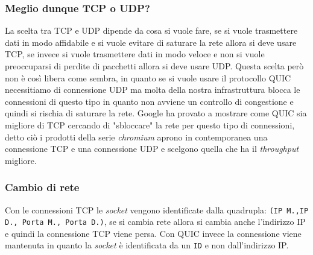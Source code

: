         \subsubsection{Meglio dunque \Acrshort*{TCP} o \Acrshort*{UDP}?}
        La scelta tra \Acrshort*{TCP} e \Acrshort*{UDP} dipende da cosa si vuole fare, se si vuole trasmettere dati in modo affidabile e si vuole evitare di saturare la rete allora si deve usare \Acrshort*{TCP}, se invece si vuole trasmettere dati in modo veloce e non si vuole preoccuparsi di perdite di pacchetti allora si deve usare \Acrshort*{UDP}. Questa scelta però non è così libera come sembra, in quanto se si vuole usare il protocollo \Acrshort*{QUIC} necessitiamo di connessione \Acrshort*{UDP} ma molta della nostra infrastruttura blocca le connessioni di questo tipo in quanto non avviene un controllo di congestione e quindi si rischia di saturare la rete. Google ha provato a mostrare come \Acrshort*{QUIC} sia migliore di \Acrshort*{TCP} cercando di "sbloccare" la rete per questo tipo di connessioni, detto ciò i prodotti della serie \textit{chromium} aprono in contemporanea una connessione \Acrshort*{TCP} e una connessione \Acrshort*{UDP} e scelgono quella che ha il \textit{throughput} migliore. 
        \subsubsection{Cambio di rete}
            Con le connessioni \Acrshort*{TCP} le \textit{socket} vengono identificate dalla quadrupla: \texttt{(\Acrshort*{IP} M.,\Acrshort*{IP} D., Porta M., Porta D.)}, se si cambia rete allora si cambia anche l'indirizzo \Acrshort*{IP} e quindi la connessione \Acrshort*{TCP} viene persa. Con \Acrshort*{QUIC} invece la connessione viene mantenuta in quanto la \textit{socket} è identificata da un \texttt{ID} e non dall'indirizzo \Acrshort*{IP}.